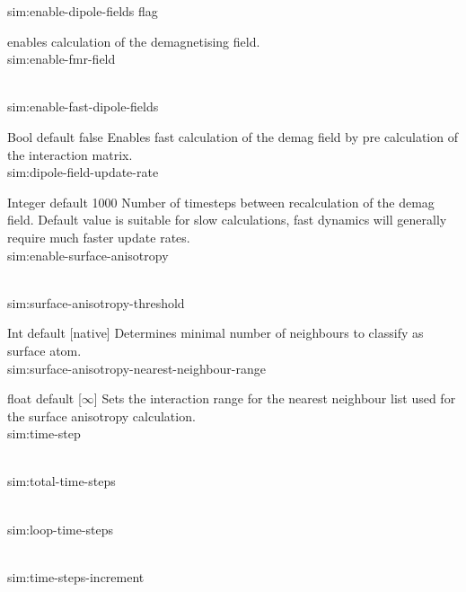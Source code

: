 
{\zicf sim:enable-dipole-fields flag} enables calculation of the demagnetising field.\\

{\zicf   sim:enable-fmr-field}\\

{\zicf   sim:enable-fast-dipole-fields}
     Bool default false
     Enables fast calculation of the demag field by pre calculation of the interaction matrix.\\

{\zicf sim:dipole-field-update-rate}
   Integer default 1000
   Number of timesteps between recalculation of the demag field. Default value is suitable for slow calculations, fast dynamics will generally require much faster update rates.\\

{\zicf  sim:enable-surface-anisotropy}\\

{\zicf sim:surface-anisotropy-threshold}
  Int default [native]
  Determines minimal number of neighbours to classify as surface atom.\\

{\zicf sim:surface-anisotropy-nearest-neighbour-range}
  float default [$\infty$]
  Sets the interaction range for the nearest neighbour list used for the surface anisotropy calculation.\\

{\zicf sim:time-step}\\

{\zicf sim:total-time-steps}\\

{\zicf sim:loop-time-steps}\\

{\zicf sim:time-steps-increment}\\

